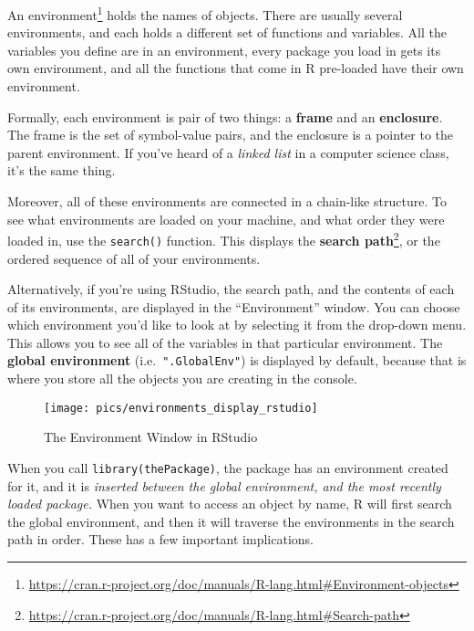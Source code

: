 \documentclass[12pt,krantz2]{krantz}
\renewcommand{\href}[2]{#2\footnote{\url{#1}}}
\begin{document}
An \href{https://cran.r-project.org/doc/manuals/R-lang.html\#Environment-objects}{environment} holds the names of objects. There are usually several environments, and each holds a different set of functions and variables. All the variables you define are in an environment, every package you load in gets its own environment, and all the functions that come in R pre-loaded have their own environment.

\begin{rmd-details}
Formally, each environment is pair of two things: a \textbf{frame} and an \textbf{enclosure}. The frame is the set of symbol-value pairs, and the enclosure is a pointer to the parent environment. If you've heard of a \emph{linked list} in a computer science class, it's the same thing.

\end{rmd-details}

Moreover, all of these environments are connected in a chain-like structure. To see what environments are loaded on your machine, and what order they were loaded in, use the \texttt{search()} function. This displays the \href{https://cran.r-project.org/doc/manuals/R-lang.html\#Search-path}{\textbf{search path}}, or the ordered sequence of all of your environments.

Alternatively, if you're using RStudio, the search path, and the contents of each of its environments, are displayed in the ``Environment'' window. You can choose which environment you'd like to look at by selecting it from the drop-down menu. This allows you to see all of the variables in that particular environment. The \textbf{global environment} (i.e.~\texttt{".GlobalEnv"}) is displayed by default, because that is where you store all the objects you are creating in the console.

\begin{figure}

{\centering \texttt{[image: pics/environments\_display\_rstudio]} 

}

\caption{The Environment Window in RStudio}\label{fig:rstudiodisp}
\end{figure}

When you call \texttt{library(thePackage)}, the package has an environment created for it, and it is \emph{inserted between the global environment, and the most recently loaded package.} When you want to access an object by name, R will first search the global environment, and then it will traverse the environments in the search path in order. These has a few important implications.
\end{document}
